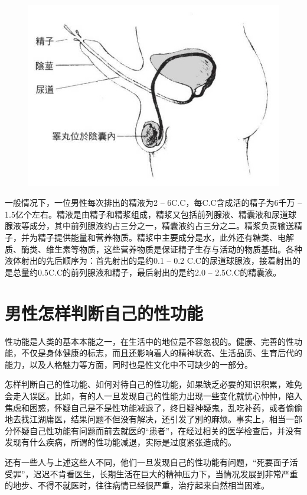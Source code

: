 \documentclass[12pt,UTF8]{ctexbook}
\begin{document}
\begin{figure}[htbp]
	\centering
	\includegraphics[width=0.7\linewidth]{5}
	\caption{}
\end{figure}

一般情况下，一位男性每次排出的精液为2 -- 6C.C，每C.C含成活的精子为6千万 -- 1.5亿个左右。精液是由精子和精浆组成，精浆又包括前列腺液、精囊液和尿道球腺液等成分，其中前列腺液约占三分之一，精囊液约占三分之二。精浆负责输送精子，并为精子提供能量和营养物质。精浆中主要成分是水，此外还有糖类、电解质、酶类、维生素等物质，这些营养物质是保证精子生存与活动的物质基础。各种液体射出的先后顺序为：首先射出的是约0.1 -- 0.2 C.C的尿道球腺液，接着射出的是总量约0.5C.C的前列腺液和精子，最后射出的是约2.0 -- 2.5C.C的精囊液。

\section{男性怎样判断自己的性功能}

性功能是人类的基本本能之一，在生活中的地位是不容忽视的。健康、完善的性功能，不仅是身体健康的标志，而且还影响着人的精神状态、生活品质、生育后代的能力，以及人格魅力等方面，同时也是性文化中不可缺少的一部分。

怎样判断自己的性功能、如何对待自己的性功能，如果缺乏必要的知识积累，难免会走入误区。比如，有的人一旦发现自己的性能力出现一些变化就忧心忡忡，陷入焦虑和困惑，怀疑自己是不是性功能减退了，终日疑神疑鬼，乱吃补药，或者偷偷地去找江湖庸医，结果问题不但没有解决，还引发了別的麻烦。事实上，相当一部分怀疑自己性功能有问题而前去就医的“患者”，在经过相关的医学检查后，并没有发现有什么疾病，所谓的性功能减退，实际是过度紧张造成的。

还有一些人与上述这些人不同，他们一旦发现自己的性功能有问题，“死要面子活受罪”，迟迟不肯看医生，长期生活在巨大的精神压力下，当情况发展到非常严重的地步、不得不就医时，往往病情已经很严重，治疗起来自然相当困难。
\end{document}
